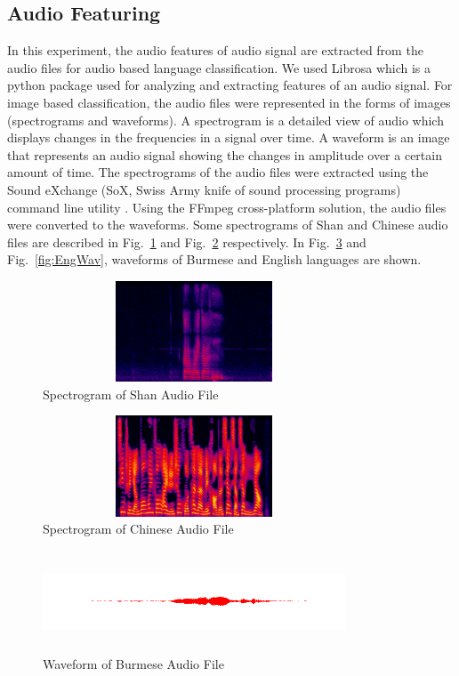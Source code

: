 \documentclass[conference]{IEEEtran}
\begin{document}
\subsection{Audio Featuring}\label{SubSec:AudioFeaturing}
In this experiment, the audio features of audio signal are extracted from the audio files for audio based language classification. We used Librosa which is a python package used for analyzing and extracting features of an audio signal. For image based classification, the audio files were represented in the forms of images (spectrograms and waveforms). A spectrogram is a detailed view of audio which displays changes in the frequencies in a signal over time. A waveform is an image that represents an audio signal showing the changes in amplitude over a certain amount of time. The spectrograms of the audio files were extracted using the Sound eXchange (SoX, Swiss Army knife of sound processing programs) command line utility \cite{b10}. Using the FFmpeg cross-platform solution, the audio files were converted to the waveforms. Some spectrograms of Shan and Chinese audio files are described in Fig.~\ref{fig:ShanSpec} and Fig.~\ref{fig:ChinaSpec} respectively. In Fig.~\ref{fig:BurmaWav} and Fig.~\ref{fig:EngWav}, waveforms of Burmese and English languages are shown.

\begin{figure}[t]
\centerline{\includegraphics[width=90mm,height=3cm]{shanspec.jpg}}
\caption{Spectrogram of Shan Audio File}
\label{fig:ShanSpec}
\end{figure}

\begin{figure}[t]
\centerline{\includegraphics[width=90mm,height=3cm]{chinaspec.jpg}}
\caption{Spectrogram of Chinese Audio File}
\label{fig:ChinaSpec}
\end{figure}

\begin{figure}[t]
\centerline{\includegraphics[width=90mm,height=3cm]{burmawav.png}}
\caption{Waveform of Burmese Audio File}
\label{fig:BurmaWav}
\end{figure}
\end{document}
